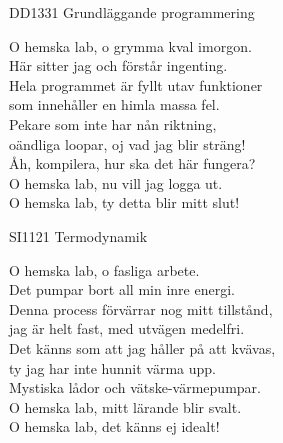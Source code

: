 \documentclass[a6paper, 10pt, twoside]{article}
\begin{document}
\begin{center}
\footnotesize DD1331 Grundläggande programmering\\
\end{center}
\begin{lyrics}
O hemska lab, o grymma kval imorgon. \\
Här sitter jag och förstår ingenting. \\
Hela programmet är fyllt utav funktioner\\
som innehåller en himla massa fel. 
\vspace{5pt} \\
Pekare som inte har nån riktning, \\
oändliga loopar, oj vad jag blir sträng!
\vspace{5pt} \\
Åh, kompilera, hur ska det här fungera? \\
O hemska lab, nu vill jag logga ut. \\
O hemska lab, ty detta blir mitt slut! 
\end{lyrics}

\begin{center}
\footnotesize SI1121 Termodynamik\\
\end{center}
\begin{lyrics}
O hemska lab, o fasliga arbete. \\
Det pumpar bort all min inre energi. \\
Denna process förvärrar nog mitt tillstånd, \\
jag är helt fast, med utvägen medelfri. 
\vspace{5pt} \\
Det känns som att jag håller på att kvävas, \\
ty jag har inte hunnit värma upp. 
\vspace{5pt} \\
Mystiska lådor och vätske-värmepumpar. \\
O hemska lab, mitt lärande blir svalt. \\
O hemska lab, det känns ej idealt! 
\end{lyrics}
\end{document}
